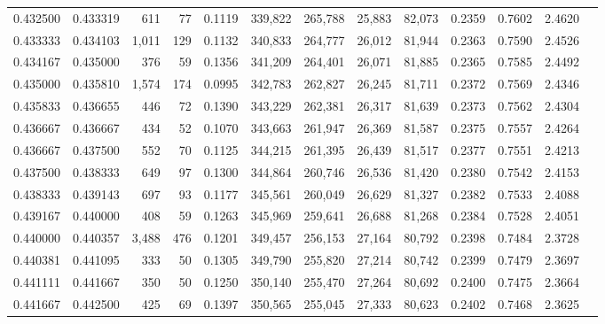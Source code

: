 \begin{tabular}{rrrrrrrrrrrrr}
0.432500 & 0.433319 &   611 &  77 &                                     0.1119 & 339,822 & 265,788 &  25,883 &  82,073 & 0.2359 & 0.7602 & 2.4620 \\
0.433333 & 0.434103 & 1,011 & 129 &                                     0.1132 & 340,833 & 264,777 &  26,012 &  81,944 & 0.2363 & 0.7590 & 2.4526 \\
0.434167 & 0.435000 &   376 &  59 &                                     0.1356 & 341,209 & 264,401 &  26,071 &  81,885 & 0.2365 & 0.7585 & 2.4492 \\
0.435000 & 0.435810 & 1,574 & 174 &                                     0.0995 & 342,783 & 262,827 &  26,245 &  81,711 & 0.2372 & 0.7569 & 2.4346 \\
0.435833 & 0.436655 &   446 &  72 &                                     0.1390 & 343,229 & 262,381 &  26,317 &  81,639 & 0.2373 & 0.7562 & 2.4304 \\
0.436667 & 0.436667 &   434 &  52 &                                     0.1070 & 343,663 & 261,947 &  26,369 &  81,587 & 0.2375 & 0.7557 & 2.4264 \\
0.436667 & 0.437500 &   552 &  70 &                                     0.1125 & 344,215 & 261,395 &  26,439 &  81,517 & 0.2377 & 0.7551 & 2.4213 \\
0.437500 & 0.438333 &   649 &  97 &                                     0.1300 & 344,864 & 260,746 &  26,536 &  81,420 & 0.2380 & 0.7542 & 2.4153 \\
0.438333 & 0.439143 &   697 &  93 &                                     0.1177 & 345,561 & 260,049 &  26,629 &  81,327 & 0.2382 & 0.7533 & 2.4088 \\
0.439167 & 0.440000 &   408 &  59 &                                     0.1263 & 345,969 & 259,641 &  26,688 &  81,268 & 0.2384 & 0.7528 & 2.4051 \\
0.440000 & 0.440357 & 3,488 & 476 &                                     0.1201 & 349,457 & 256,153 &  27,164 &  80,792 & 0.2398 & 0.7484 & 2.3728 \\
0.440381 & 0.441095 &   333 &  50 &                                     0.1305 & 349,790 & 255,820 &  27,214 &  80,742 & 0.2399 & 0.7479 & 2.3697 \\
0.441111 & 0.441667 &   350 &  50 &                                     0.1250 & 350,140 & 255,470 &  27,264 &  80,692 & 0.2400 & 0.7475 & 2.3664 \\
0.441667 & 0.442500 &   425 &  69 &                                     0.1397 & 350,565 & 255,045 &  27,333 &  80,623 & 0.2402 & 0.7468 & 2.3625 \\

\end{tabular}

